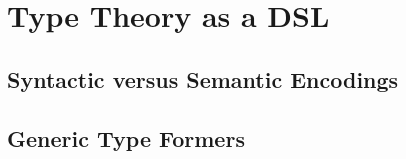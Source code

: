 \documentclass[12pt]{report}
\theoremstyle{definition}
\theoremstyle{remark}
\numberwithin{definition}{section}
\numberwithin{equation}{section}
\numberwithin{proposition}{section}
\numberwithin{conjecture}{section}
\numberwithin{theorem}{section}
\numberwithin{lemma}{section}
\numberwithin{corollary}{section}
\numberwithin{example}{section}
\numberwithin{remark}{section}
\begin{document}




\chapter{Type Theory as a DSL}\label{ch:gelim}

\section{Syntactic versus Semantic Encodings}
\section{Generic Type Formers}
\end{document}
